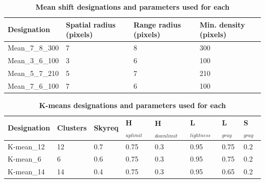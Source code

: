 \documentclass[final,3p,times,authoryear]{elsarticle}
\begin{document}
\begin{table}[!htbp]
\caption{\bf Mean shift designations and parameters used for each \label{tab:techniques2}}     
\begin{tabular}{ l  l  l l}
\textbf{Designation}  & \textbf{Spatial radius (pixels)}&\textbf{Range radius (pixels)}&\textbf{Min. density (pixels)}   \\ \hline
Mean\_7\_8\_300 & 7 & 8& 300 \\
Mean\_3\_6\_100	 & 3& 6& 100 \\
Mean\_5\_7\_210	 & 5& 7& 210 \\	 
Mean\_7\_6\_100	 & 7& 6& 100 \\

\hline
\end{tabular}
\end{table}

\begin{table}[!htbp]
\caption{\bf K-means designations and parameters used for each \label{tab:techniques3}}     
\begin{tabular}{ l l l l l l l l}
\textbf{Designation} & \textbf{Clusters} & \textbf{Skyreq}&\textbf{H$_{uplimit}$}&\textbf{H$_{downlimit}$} & \textbf{L$_{lightness}$} & \textbf{L$_{gray}$}& \textbf{S$_{gray}$} \\ \hline
K-mean\_12  & 12 & 0.7& 0.75& 0.3 & 0.95 & 0.75 & 0.2 \\
K-mean\_6  & 6 & 0.6& 0.75& 0.3 & 0.95 & 0.75 & 0.2 \\
K-mean\_14  & 14 & 0.4& 0.75& 0.3 & 0.95 & 0.65 & 0.2 \\
\hline
\end{tabular}
\end{table}

	
\end{document}
